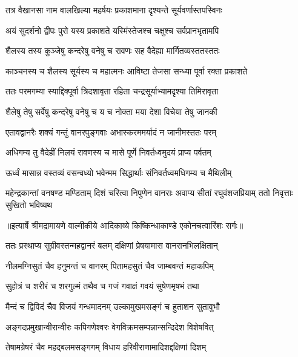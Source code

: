 \twolineshloka
{तत्र वैखानसा नाम वालखिल्या महर्षयः}
{प्रकाशमाना दृश्यन्ते सूर्यवर्णास्तपस्विनः} %

\twolineshloka
{अयं सुदर्शनो द्वीपः पुरो यस्य प्रकाशते}
{यस्मिंस्तेजश्च चक्षुश्च सर्वप्रानभृतामपि} %

\twolineshloka
{शैलस्य तस्य कुञ्जेषु कन्दरेषु वनेषु च}
{रावणः सह वैदेह्या मार्गितव्यस्ततस्ततः} %

\twolineshloka
{काञ्चनस्य च शैलस्य सूर्यस्य च महात्मनः}
{आविष्टा तेजसा सन्ध्या पूर्वा रक्ता प्रकाशते} %

\twolineshloka
{ततः परमगम्या स्याद्दिक्पूर्वा त्रिदशावृता}
{रहिता चन्द्रसूर्याभ्यामदृश्या तिमिरावृता} %

\twolineshloka
{शैलेषु तेषु सर्वेषु कन्दरेषु वनेषु च}
{य च नोक्ता मया देशा विचेया तेषु जानकी} %

\twolineshloka
{एतावद्वानरैः शक्यं गन्तुं वानरपुङ्गवाः}
{अभास्करममर्यादं न जानीमस्ततः परम्} %

\twolineshloka
{अधिगम्य तु वैदेहीं निलयं रावणस्य च}
{मासे पूर्णे निवर्तध्वमुदयं प्राप्य पर्वतम्} %

\twolineshloka
{ऊर्ध्वं मासान्न वस्तव्यं वसन्वध्यो भवेन्मम}
{सिद्धार्थाः संनिवर्तध्वमधिगम्य च मैथिलीम्} %

\fourlineindentedshloka
{महेन्द्रकान्तां वनषण्ड मण्डिताम्}
{दिशं चरित्वा निपुणेन वानराः}
{अवाप्य सीतां रघुवंशजप्रियाम्}
{ततो निवृत्ताः सुखितो भविष्यथ} %


{॥इत्यार्षे श्रीमद्रामायणे वाल्मीकीये आदिकाव्ये किष्किन्धाकाण्डे एकोनचत्वारिंशः सर्गः॥}


\twolineshloka
{ततः प्रस्थाप्य सुग्रीवस्तन्महद्वानरं बलम्}
{दक्षिणां प्रेषयामास वानरानभिलक्षितान्} %

\twolineshloka
{नीलमग्निसुतं चैव हनुमन्तं च वानरम्}
{पितामहसुतं चैव जाम्बवन्तं महाकपिम्} %

\twolineshloka
{सुहोत्रं च शरीरं च शरगुल्मं तथैव च}
{गजं गवाक्षं गवयं सुषेणमृषभं तथा} %

\twolineshloka
{मैन्दं च द्विविदं चैव विजयं गन्धमादनम्}
{उल्कामुखमसङ्गं च हुताशन सुतावुभौ} %

\twolineshloka
{अङ्गदप्रमुखान्वीरान्वीरः कपिगणेश्वरः}
{वेगविक्रमसम्पन्नान्सन्दिदेश विशेषवित्} %

\twolineshloka
{तेषामग्रेषरं चैव महद्बलमसङ्गगम्}
{विधाय हरिवीराणामादिशद्दक्षिणां दिशम्} %

